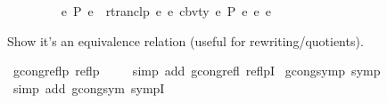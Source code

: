 \begin{isabellebody}
\ \ {\isacharparenleft}{\kern0pt}{\isachardoublequoteopen}{\isacharunderscore}{\kern0pt}\ {\isacharminus}{\kern0pt}{\isachargreater}{\kern0pt}{\isacharbraceleft}{\kern0pt}{\isacharunderscore}{\kern0pt}{\isacharbraceright}{\kern0pt}{\isacharasterisk}{\kern0pt}\ {\isacharunderscore}{\kern0pt}{\isachardoublequoteclose}\ {\isacharbrackleft}{\kern0pt}{}{}{\isacharcomma}{\kern0pt}{}{\isacharcomma}{\kern0pt}{}{}{\isacharbrackright}{\kern0pt}\ {}{}{\isacharparenright}{\kern0pt}\isanewline
{}\isanewline
\ \ {\isachardoublequoteopen}e\ {\isacharminus}{\kern0pt}{\isachargreater}{\kern0pt}{\isacharbraceleft}{\kern0pt}P{\isacharbraceright}{\kern0pt}{\isacharasterisk}{\kern0pt}\ e{\isacharprime}{\kern0pt}\ {\isasymequiv}\ rtranclp\ {\isacharparenleft}{\kern0pt}{\isasymlambda}e\ e{\isacharprime}{\kern0pt}{\isachardot}{\kern0pt}\ cbv{\isacharunderscore}{\kern0pt}ty\ e\ P\ e{\isacharprime}{\kern0pt}{\isacharparenright}{\kern0pt}\ e\ e{\isacharprime}{\kern0pt}{\isachardoublequoteclose}%
\isadelimdocument
%
\endisadelimdocument
%
\isatagdocument
%
\isamarkuptrue%
%
\endisatagdocument
{\isafolddocument}%
%
\isadelimdocument
%
\endisadelimdocument
%
\begin{isamarkuptext}%
Show it's an equivalence relation (useful for rewriting/quotients).%
\end{isamarkuptext}\isamarkuptrue%
\isamarkupfalse%
\ gcong{\isacharunderscore}{\kern0pt}reflp{\isacharcolon}{\kern0pt}\ {\isachardoublequoteopen}reflp\ {\isacharparenleft}{\kern0pt}{\isasymsimeq}{\isacharparenright}{\kern0pt}{\isachardoublequoteclose}\isanewline
%
\isadelimproof
\ \ %
\endisadelimproof
%
\isatagproof
{}\isamarkupfalse%
\ {\isacharparenleft}{\kern0pt}simp\ add{\isacharcolon}{\kern0pt}\ gcong{\isachardot}{\kern0pt}refl\ reflpI{\isacharparenright}{\kern0pt}%
\endisatagproof
{\isafoldproof}%
%
\isadelimproof
\isanewline
%
\endisadelimproof
\isanewline
{}\isamarkupfalse%
\ gcong{\isacharunderscore}{\kern0pt}symp{\isacharcolon}{\kern0pt}\ {\isachardoublequoteopen}symp\ {\isacharparenleft}{\kern0pt}{\isasymsimeq}{\isacharparenright}{\kern0pt}{\isachardoublequoteclose}\isanewline
%
\isadelimproof
\ \ %
\endisadelimproof
%
\isatagproof
{}\isamarkupfalse%
\ {\isacharparenleft}{\kern0pt}simp\ add{\isacharcolon}{\kern0pt}\ gcong{\isachardot}{\kern0pt}sym\ sympI{\isacharparenright}{\kern0pt}%
\endisatagproof
{\isafoldproof}%
%
\isadelimproof
\isanewline

\end{isabellebody}
